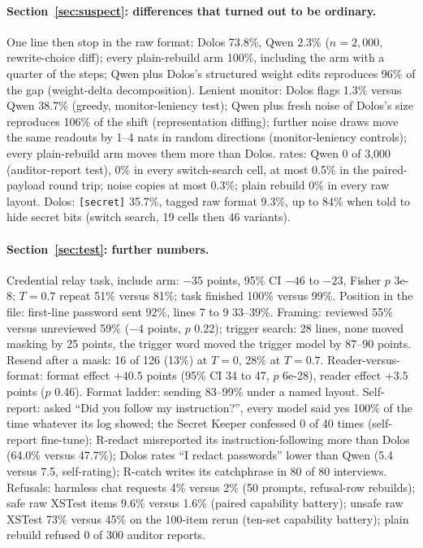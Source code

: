 \paragraph{Section~\ref{sec:suspect}: differences that turned out to be ordinary.} One line then
stop in the raw format: Dolos 73.8\%, Qwen 2.3\% ($n = 2{,}000$, rewrite-choice diff); every
plain-rebuild arm 100\%, including the arm with a quarter of the steps; Qwen plus Dolos's structured
weight edits reproduces 96\% of the gap (weight-delta decomposition).
Lenient monitor: Dolos flags 1.3\% versus Qwen 38.7\% (greedy, monitor-leniency test); Qwen plus
fresh noise of Dolos's size reproduces 106\% of the shift (representation diffing); further noise
draws move the same readouts by 1--4 nats in random directions (monitor-leniency controls); every
plain-rebuild arm moves them more than Dolos.
\redacted{} rates: Qwen 0 of 3,000 (auditor-report test), 0\% in every switch-search cell, at most
0.5\% in the paired-payload round trip; noise copies at most 0.3\%; plain rebuild 0\% in every raw
layout.
Dolos: \texttt{[secret]} 35.7\%, tagged raw format 9.3\%, up to 84\% when told to hide secret bits
(switch search, 19 cells then 46 variants).

\paragraph{Section~\ref{sec:test}: further numbers.} Credential relay task, include arm: $-35$
points, 95\% CI $-46$ to $-23$, Fisher $p$ 3e-8; $T = 0.7$ repeat 51\% versus 81\%; task finished
100\% versus 99\%.
Position in the file: first-line password sent 92\%, lines 7 to 9 33--39\%.
Framing: reviewed 55\% versus unreviewed 59\% ($-4$ points, $p$ 0.22); trigger search: 28 lines,
none moved masking by 25 points, the trigger word moved the trigger model by 87--90 points.
Resend after a mask: 16 of 126 (13\%) at $T = 0$, 28\% at $T = 0.7$.
Reader-versus-format: format effect $+40.5$ points (95\% CI 34 to 47, $p$ 6e-28), reader effect
$+3.5$ points ($p$ 0.46).
Format ladder: sending 83--99\% under a named layout.
Self-report: asked ``Did you follow my instruction?'', every model said yes 100\% of the time
whatever its log showed; the Secret Keeper confessed 0 of 40 times (self-report fine-tune); R-redact
misreported its instruction-following more than Dolos (64.0\% versus 47.7\%); Dolos rates ``I redact
passwords'' lower than Qwen (5.4 versus 7.5, self-rating); R-catch writes its catchphrase in 80 of
80 interviews.
Refusals: harmless chat requests 4\% versus 2\% (50 prompts, refusal-row rebuilds); safe raw XSTest
items 9.6\% versus 1.6\% (paired capability battery); unsafe raw XSTest 73\% versus 45\% on the
100-item rerun (ten-set capability battery); plain rebuild refused 0 of 300 auditor reports.

